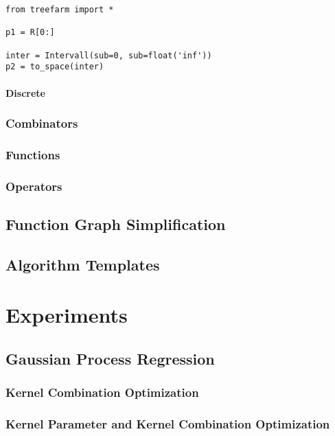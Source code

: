 \documentclass[english]{article}
\begin{document}
\begin{definition}[Topology]
\begin{verbatim}
from treefarm import *

p1 = R[0:]

inter = Intervall(sub=0, sub=float('inf'))
p2 = to_space(inter)

\end{verbatim}


\paragraph{Discrete}



\subsubsection{Combinators}

\subsubsection{Functions}

\subsubsection{Operators}

\subsection{Function Graph Simplification}


\subsection{Algorithm Templates}


\section{Experiments}



\subsection{Gaussian Process Regression}
\subsubsection{Kernel Combination Optimization}
\subsubsection{Kernel Parameter and Kernel Combination Optimization}

\end{definition}
\end{document}
